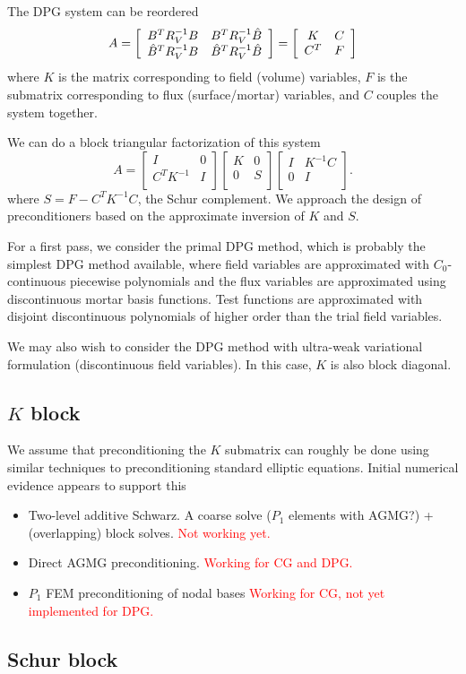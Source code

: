 \documentclass{article}
\def\arr#1#2#3#4{\left[
\begin{array}{cc}
#1 & #2\\
#3 & #4\\
\end{array}
\right]}
\begin{document}
The DPG system can be reordered 
\[
A = \left[\begin{array}{c c}
B^TR_V^{-1}B & B^TR_V^{-1}\hat{B}\\
\hat{B}^TR_V^{-1}B & \hat{B}^TR_V^{-1}\hat{B}
\end{array}
\right] = \arr{K}{C}{C^T}{F}
\]
where $K$ is the matrix corresponding to field (volume) variables, $F$ is the submatrix corresponding to flux (surface/mortar) variables, and $C$ couples the system together.  

We can do a block triangular factorization of this system 
\[
A = \arr{I}{0}{C^TK^{-1}}{I}\arr{K}{0}{0}{S}\arr{I}{K^{-1}C}{0}{I}.
\]
where $S = F - C^TK^{-1}C$, the Schur complement.  We approach the design of preconditioners based on the approximate inversion of $K$ and $S$.  

For a first pass, we consider the primal DPG method, which is probably the simplest DPG method available, where field variables are approximated with $C_0$-continuous piecewise polynomials and the flux variables are approximated using discontinuous mortar basis functions.  Test functions are approximated with disjoint discontinuous polynomials of higher order than the trial field variables.  

We may also wish to consider the DPG method with ultra-weak variational formulation (discontinuous field variables).  In this case, $K$ is also block diagonal.  

\subsection{$K$ block}

We assume that preconditioning the $K$ submatrix can roughly be done using similar techniques to preconditioning standard elliptic equations.  Initial numerical evidence appears to support this

\begin{itemize}
\item Two-level additive Schwarz.  A coarse solve ($P_1$ elements with AGMG?) + (overlapping) block solves.  \textcolor{red}{Not working yet.}
\item Direct AGMG preconditioning.  \textcolor{red}{Working for CG and DPG.}
\item $P_1$ FEM preconditioning of nodal bases \textcolor{red}{Working for CG, not yet implemented for DPG.}
\end{itemize}

\subsection{Schur block}
\end{document}

